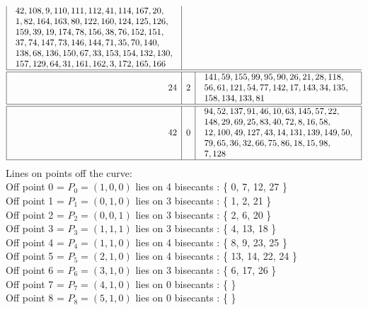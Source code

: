 \documentclass{article}
\begin{document}
{$$\begin{array}{|r|r|l|}
\begin{array}{l}
42, 108, 9, 110, 111, 112, 41, 114, 167, 20, \\
1, 82, 164, 163, 80, 122, 160, 124, 125, 126, \\
159, 39, 19, 174, 78, 156, 38, 76, 152, 151, \\
37, 74, 147, 73, 146, 144, 71, 35, 70, 140, \\
138, 68, 136, 150, 67, 33, 153, 154, 132, 130, \\
157, 129, 64, 31, 161, 162, 3, 172, 165, 166\\
\end{array}
\\
\hline
\hline
24 & 2 & \begin{array}{l}
141, 59, 155, 99, 95, 90, 26, 21, 28, 118, \\
56, 61, 121, 54, 77, 142, 17, 143, 34, 135, \\
158, 134, 133, 81\end{array}
\\
\hline
\hline
42 & 0 & \begin{array}{l}
94, 52, 137, 91, 46, 10, 63, 145, 57, 22, \\
148, 29, 69, 25, 83, 40, 72, 8, 16, 58, \\
12, 100, 49, 127, 43, 14, 131, 139, 149, 50, \\
79, 65, 36, 32, 66, 75, 86, 18, 15, 98, \\
7, 128\end{array}
\\
\hline
\end{array}
$$
Lines on points off the curve:\\
Off point 0 = $P_{0} = ( 1, 0, 0 )$ lies on 4 bisecants : \{ 0, 7, 12, 27 \}\\
Off point 1 = $P_{1} = ( 0, 1, 0 )$ lies on 3 bisecants : \{ 1, 2, 21 \}\\
Off point 2 = $P_{2} = ( 0, 0, 1 )$ lies on 3 bisecants : \{ 2, 6, 20 \}\\
Off point 3 = $P_{3} = ( 1, 1, 1 )$ lies on 3 bisecants : \{ 4, 13, 18 \}\\
Off point 4 = $P_{4} = ( 1, 1, 0 )$ lies on 4 bisecants : \{ 8, 9, 23, 25 \}\\
Off point 5 = $P_{5} = ( 2, 1, 0 )$ lies on 4 bisecants : \{ 13, 14, 22, 24 \}\\
Off point 6 = $P_{6} = ( 3, 1, 0 )$ lies on 3 bisecants : \{ 6, 17, 26 \}\\
Off point 7 = $P_{7} = ( 4, 1, 0 )$ lies on 0 bisecants : \{  \}\\
Off point 8 = $P_{8} = ( 5, 1, 0 )$ lies on 0 bisecants : \{  \}\\
}
\end{document}
